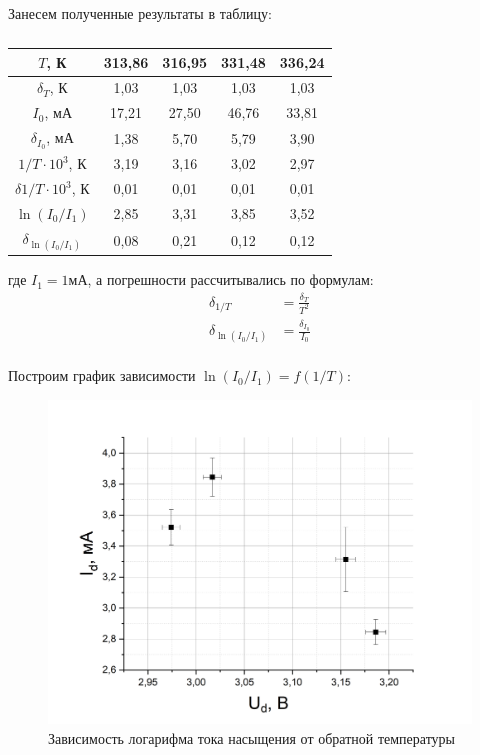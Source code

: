\documentclass[a4paper,12pt]{article}
\begin{document}
\newpage

Занесем полученные результаты в таблицу:

\begin{table}[h]
\centering
\caption{}
\begin{tabular}{|c|c|c|c|c|}
\hline
$T$, К & 313,86 & 316,95 & 331,48 & 336,24 \\ \hline
$\delta_T$, К & 1,03 & 1,03 & 1,03 & 1,03 \\ \hline
$I_0$, мА & 17,21 & 27,50 & 46,76 & 33,81 \\ \hline
$\delta_{I_0}$, мА & 1,38 & 5,70 & 5,79 & 3,90 \\ \hline
$1/T \cdot 10^3$, К & 3,19 & 3,16 & 3,02 & 2,97 \\ \hline
$\delta 1/T \cdot 10^3$, К & 0,01 & 0,01 & 0,01 & 0,01 \\ \hline
$\ln(I_0/I_1)$ & 2,85 & 3,31 & 3,85 & 3,52 \\ \hline
$\delta_{\ln(I_0/I_1)}$ & 0,08 & 0,21 & 0,12 & 0,12 \\ \hline
\end{tabular}
\end{table}

где $I_1 = 1 мА$, а погрешности рассчитывались по формулам:
\begin{align*}
	\delta_{1/T} &= \frac{\delta_T}{T^2} \\
	\delta_{\ln(I_0/I_1)} &= \frac{\delta_{I_0}}{I_0} \\
\end{align*}

Построим график зависимости $\ln (I_0/I_1) = f(1/T)$:

\begin{figure}[h!]
	\centering
	\includegraphics[width=0.8\linewidth]{reverse_current}
	\caption{Зависимость логарифма тока насыщения от обратной температуры}
\end{figure}
\end{document}
